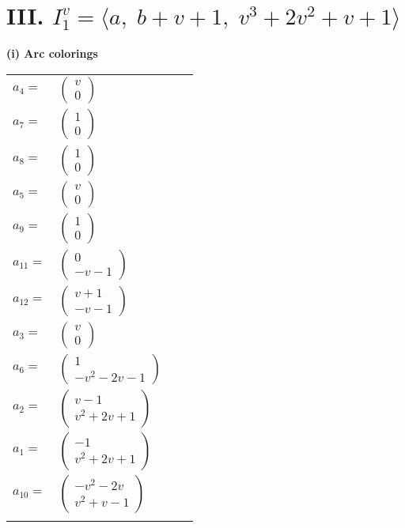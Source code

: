 \documentclass[1p]{elsarticle_modified}
\theoremstyle{definition}
\begin{document}
\centering \section*{III. $I^v_{1}= \langle a,\;b+v+1,\;v^3+2 v^2+v+1 \rangle$}
\flushleft \textbf{(i) Arc colorings}\\
\begin{tabular}{m{7pt} m{180pt} m{7pt} m{180pt} }
\flushright $a_{4}=$&$\begin{pmatrix}v\\0\end{pmatrix}$ \\
\flushright $a_{7}=$&$\begin{pmatrix}1\\0\end{pmatrix}$ \\
\flushright $a_{8}=$&$\begin{pmatrix}1\\0\end{pmatrix}$ \\
\flushright $a_{5}=$&$\begin{pmatrix}v\\0\end{pmatrix}$ \\
\flushright $a_{9}=$&$\begin{pmatrix}1\\0\end{pmatrix}$ \\
\flushright $a_{11}=$&$\begin{pmatrix}0\\- v-1\end{pmatrix}$ \\
\flushright $a_{12}=$&$\begin{pmatrix}v+1\\- v-1\end{pmatrix}$ \\
\flushright $a_{3}=$&$\begin{pmatrix}v\\0\end{pmatrix}$ \\
\flushright $a_{6}=$&$\begin{pmatrix}1\\- v^2-2 v-1\end{pmatrix}$ \\
\flushright $a_{2}=$&$\begin{pmatrix}v-1\\v^2+2 v+1\end{pmatrix}$ \\
\flushright $a_{1}=$&$\begin{pmatrix}-1\\v^2+2 v+1\end{pmatrix}$ \\
\flushright $a_{10}=$&$\begin{pmatrix}- v^2-2 v\\v^2+v-1\end{pmatrix}$\\&\end{tabular}
\end{document}
